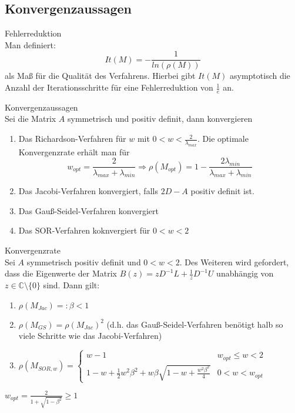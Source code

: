 \subsection{Konvergenzaussagen}
\begin{definition}
	 Fehlerreduktion
	\\
	Man definiert:
	$$It(M)=-\frac{1}{ln(\rho(M))}$$
	als Maß für die Qualität des Verfahrens. Hierbei gibt $It(M)$ asymptotisch die Anzahl der Iterationsschritte für eine Fehlerreduktion
	von $\frac{1}{e}$ an.
\end{definition}

\begin{theorem}
	Konvergenzaussagen
	\\
	Sei die Matrix $A$ symmetrisch und positiv definit, dann konvergieren
	\begin{enumerate}
		\item Das Richardson-Verfahren für $w$ mit $0<w<\frac{2}{\lambda_{max}}$. Die optimale Konvergenzrate erhält man für
		$$w_{opt}=\frac{2}{\lambda_{max}+\lambda_{min}}\Rightarrow \rho(M_{opt})=1-\frac{2\lambda_{min}}{\lambda_{max}+\lambda_{min}}$$
		\item Das Jacobi-Verfahren konvergiert, falls $2D-A$ positiv definit ist.
		\item Das Gauß-Seidel-Verfahren konvergiert
		\item Das SOR-Verfahren koknvergiert für $0<w<2$
	\end{enumerate}
\end{theorem}

\begin{theorem}
	Konvergenzrate
	\\
	Sei $A$ symmetrisch positiv definit und $0<w<2$. Des Weiteren wird gefordert, dass die Eigenwerte der Matrix $B(z)=zD^{-1}L+\frac{1}{z}D^{-1}U$
	unabhängig von $z\in \mathbb{C}\setminus\{0\}$ sind. Dann gilt:
	\begin{enumerate}
		\item $\rho(M_{Jac})=:\beta<1$
		\item $\rho(M_{GS})=\rho(M_{Jac})^{2}$ (d.h. das Gauß-Seidel-Verfahren benötigt halb so viele Schritte wie das Jacobi-Verfahren)
		\item $\rho(M_{SOR,w})=
		\begin{cases}
		w-1 & w_{opt}\leq w<2\\
		1-w+\frac{1}{2}w^{2}\beta^{2}+w\beta\sqrt{1-w+\frac{w^{2}\beta^{2}}{4}} & 0 < w < w_{opt}
		\end{cases}$
	\end{enumerate}
	$w_{opt}=\frac{2}{1+\sqrt{1-\beta^{2}}}\geq 1$
\end{theorem}

